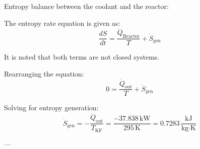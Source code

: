 Entropy balance between the coolant and the reactor:  

The entropy rate equation is given as:  
\[
\frac{dS}{dt} = \frac{\dot{Q}_{\text{Reactor}}}{T} + \dot{S}_{\text{gen}}
\]  

It is noted that both terms are not closed systems.  

Rearranging the equation:  
\[
0 = \frac{\dot{Q}_{\text{out}}}{T} + \dot{S}_{\text{gen}}
\]  

Solving for entropy generation:  
\[
\dot{S}_{\text{gen}} = -\frac{\dot{Q}_{\text{out}}}{T_{\text{KF}}} = \frac{-37.838 \, \text{kW}}{295 \, \text{K}} = 0.7283 \, \frac{\text{kJ}}{\text{kg·K}}
\]  

---